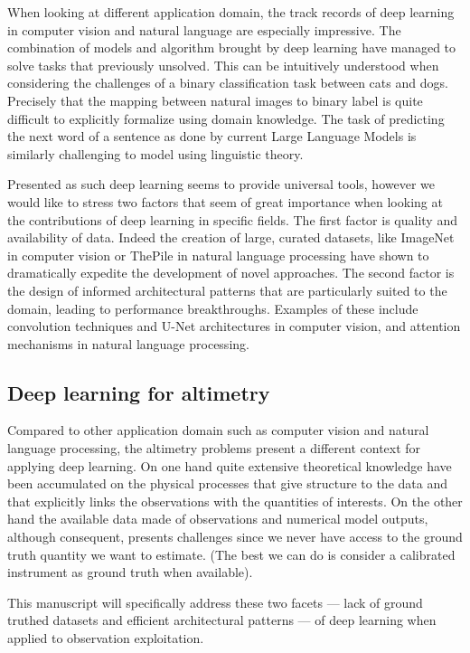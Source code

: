\begin{bibunit}
When looking at different application domain, the track records of deep learning in computer vision\cite{} and natural language\cite{} are especially impressive. 
The combination of models and algorithm brought by deep learning have managed to solve tasks that previously unsolved.
This can be intuitively understood when considering the challenges of a binary classification task between cats and dogs.
Precisely that the mapping between natural images to binary label is quite difficult to explicitly formalize using domain knowledge. 
The task of predicting the next word of a sentence as done by current Large Language Models is similarly challenging to model using linguistic theory.

Presented as such deep learning seems to provide universal tools,  
however we would like to stress two factors that seem of great importance when looking at the contributions of deep learning in specific fields.
The first factor is quality and availability of data.
Indeed the creation of large, curated datasets, like ImageNet\cite{} in computer vision or ThePile\cite{} in natural language processing have shown to dramatically expedite the development of novel approaches. 
The second factor is the design of informed architectural patterns that are particularly suited to the domain, leading to performance breakthroughs. Examples of these include convolution techniques and U-Net architectures in computer vision, and attention mechanisms in natural language processing.


\subsection{Deep learning for altimetry}
Compared to other application domain such as computer vision and natural language processing, the altimetry problems present a different context for applying deep learning. 
On one hand quite extensive theoretical knowledge have been accumulated on the physical processes that give structure to the data and that explicitly links the observations with the quantities of interests.  
On the other hand the available data made of observations and numerical model outputs, although consequent, presents challenges since we never have access to the ground truth quantity we want to estimate. (The best we can do is consider a calibrated instrument as ground truth when available). 

This manuscript will specifically address these two facets — lack of ground truthed datasets and efficient architectural patterns — of deep learning when applied to observation exploitation.




\end{bibunit}
